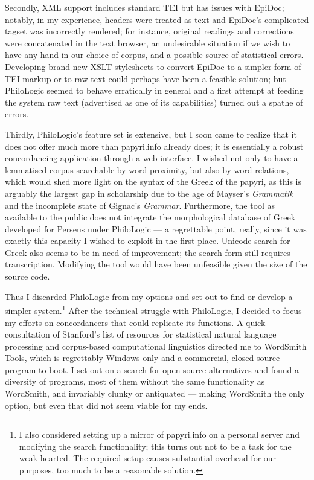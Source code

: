 \documentclass[10pt,a4paper,twoside,openright,titlepage,fleqn,%
               headinclude,,footinclude,BCOR5mm,%
               numbers=noenddot,cleardoublepage=empty,%
               tablecaptionabove]{scrbook}
\begin{document}
Secondly, XML support includes standard TEI  but has issues with EpiDoc; notably,
in my experience, headers were treated as text and EpiDoc's complicated tagset
was incorrectly rendered; for instance, original readings and corrections were
concatenated in the text browser, an undesirable situation if we wish to have
any hand in our choice of corpus, and a possible source of statistical errors.
Developing brand new XSLT stylesheets to convert EpiDoc to a simpler form of
TEI markup or to raw text could perhaps have been a feasible solution; but
PhiloLogic seemed to behave erratically in general and a first attempt at
feeding the system raw text (advertised as one of its capabilities) turned out
a spathe of errors.

Thirdly, PhiloLogic's feature set is extensive, but I soon came to realize that it
does not offer much more than papyri.info already does; it is essentially a
robust concordancing application through a web interface. I wished not only to
have a lemmatised corpus searchable by word proximity, but also by word
relations, which would shed more light on the syntax of the Greek of the
papyri, as this is arguably the largest gap in scholarship due to the age of
Mayser's \emph{Grammatik} and the incomplete state of Gignac's \emph{Grammar}.
Furthermore, the tool as available to the public does not integrate the
morphological database of Greek developed for Perseus under PhiloLogic --- a
regrettable point, really, since it was exactly this capacity I wished to
exploit in the first place. Unicode search for Greek also seems to be in need
of improvement; the search form still requires transcription. Modifying the
tool would have been unfeasible given the size of the source code.

Thus I discarded PhiloLogic from my options and set out to find or develop a
simpler system.\footnote{I also considered setting up a mirror of papyri.info
on a personal server and modifying the search functionality; this turns out not
to be a task for the weak-hearted. The required setup causes substantial
overhead for our purposes, too much to be a reasonable solution.} After the
technical struggle with PhiloLogic, I decided to focus my efforts on
concordancers that could replicate its functions. A quick consultation of
Stanford's list of resources \citep{stanfordnlpres} for statistical natural
language processing and corpus-based computational linguistics directed me to
WordSmith Tools, which is regrettably Windows-only and a commercial, closed
source program to boot.  I set out on a search for open-source alternatives and
found a diversity of programs, most of them without the same functionality as
WordSmith, and invariably clunky or antiquated --- making WordSmith the only
option, but even that did not seem viable for my ends.
\end{document}
